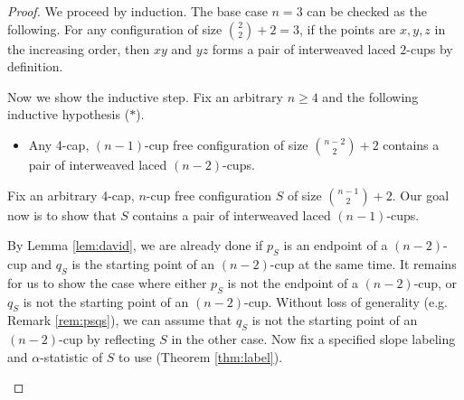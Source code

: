 \documentclass{amsart}
\theoremstyle{definition}
\numberwithin{thm}{section}
\begin{document}
\begin{proof}
We proceed by induction.
The base case $n = 3$ can be checked as the following. For any configuration of size $\binom{2}{2} + 2 = 3$, if the points are $x, y, z$ in the increasing order, then $xy$ and $yz$ forms a pair of interweaved laced $2$-cups by definition. 

Now we show the inductive step. 
Fix an arbitrary $n \geq 4$ and the following inductive hypothesis ($\ast$).
\begin{itemize}
\item[($\ast$)] Any 4-cap, $(n-1)$-cup free configuration of size $\binom{n-2}{2} + 2$ contains a pair of interweaved laced $(n-2)$-cups.
\end{itemize}
Fix an arbitrary 4-cap, $n$-cup free configuration $S$ of size $\binom{n-1}{2}+2$. 
Our goal now is to show that $S$ contains a pair of interweaved laced $(n-1)$-cups.

By Lemma \ref{lem:david}, 
we are already done if $p_S$ is an endpoint of a $(n-2)$-cup
and $q_S$ is the starting point of an $(n-2)$-cup at the same time.
It remains for us to show the case where either $p_S$ is not the endpoint of a $(n-2)$-cup, or $q_S$ is not the starting point of an $(n-2)$-cup.
Without loss of generality (e.g. Remark \ref{rem:psqs}), we can assume that $q_S$ is not the starting point of an $(n-2)$-cup by reflecting $S$ in the other case.
Now fix a specified slope labeling and $\alpha$-statistic of $S$ to use (Theorem \ref{thm:label}).

\begin{center}
\begin{figure}[h]
\centering 
{}
\end{figure}
\end{center}
\end{proof}
\end{document}
